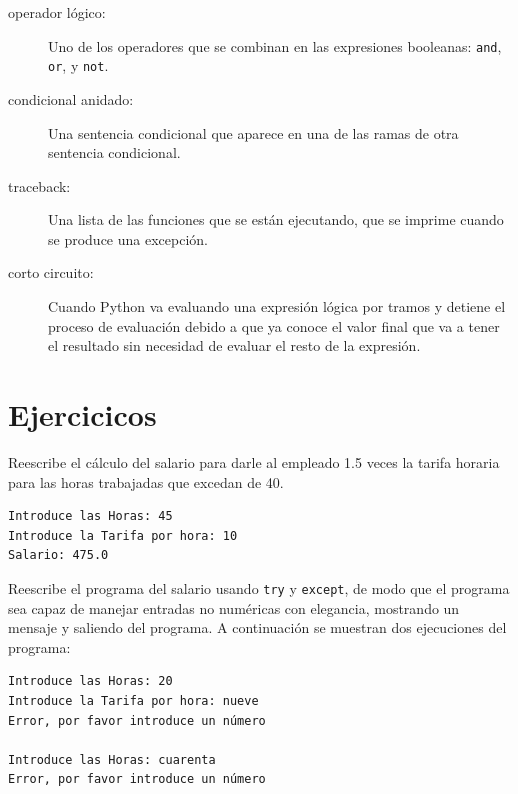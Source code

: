 \begin{description}
\item[operador lógico:] Uno de los operadores que se combinan en las expresiones
booleanas: {\tt and}, {\tt or}, y {\tt not}.

\item[condicional anidado:]  Una sentencia condicional que aparece
en una de las ramas de otra sentencia condicional.

\item[traceback:]  Una lista de las funciones que se están ejecutando,
que se imprime cuando se produce una excepción.

\item[corto circuito:]  Cuando Python va evaluando una expresión lógica
por tramos y detiene el proceso de evaluación debido a que ya
conoce el valor final que va a tener el resultado
sin necesidad de evaluar el resto de la expresión.

\end{description}

\section{Ejercicicos}

\begin{ex}
Reescribe el cálculo del salario para darle al empleado 1.5
veces la tarifa horaria para
las horas trabajadas que excedan de 40.

\begin{verbatim}
Introduce las Horas: 45
Introduce la Tarifa por hora: 10
Salario: 475.0
\end{verbatim}
\end{ex}

\begin{ex}
Reescribe el programa del salario usando {\tt try} y {\tt except},
de modo que el programa sea capaz de manejar entradas no numéricas con elegancia,
mostrando un mensaje y saliendo del programa.
A continuación se muestran dos ejecuciones del programa:

\begin{verbatim}
Introduce las Horas: 20
Introduce la Tarifa por hora: nueve
Error, por favor introduce un número

Introduce las Horas: cuarenta
Error, por favor introduce un número
\end{verbatim}
\end{ex}

